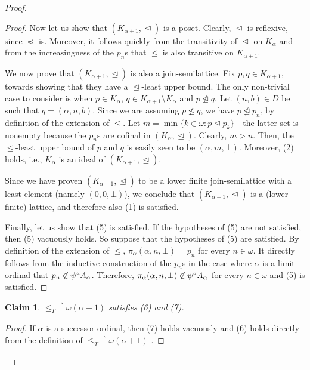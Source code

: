 \documentclass[]{amsart}
\newtheorem{claim}{Claim}[theorem]
\theoremstyle{definition}
\theoremstyle{remark}
\begin{document}
\begin{proof}
\begin{proof}
Now let us show that $(K_{\alpha+1}, \trianglelefteq)$ is a poset. Clearly, $\trianglelefteq$ is reflexive, since $\preceq$ is. Moreover, it follows quickly from the transitivity of $\trianglelefteq$ on $K_\alpha$ and from the increasingness of the $p_n$s that $\trianglelefteq$ is also transitive on $K_{\alpha+1}$. 

We now prove that $(K_{\alpha+1}, \trianglelefteq)$ is also a join-semilattice. Fix $p,q \in K_{\alpha+1}$, towards showing that they have a $\trianglelefteq$-least upper bound. The only non-trivial case to consider is when $p \in K_\alpha$, $q \in K_{\alpha+1} \setminus K_\alpha$ and $p \ntrianglelefteq q$. Let $(n, b) \in D$ be such that $q = (\alpha, n, b)$. Since we are assuming $p \ntrianglelefteq q$, we have $p \ntrianglelefteq p_n$, by definition of the extension of $\trianglelefteq$. Let $m = \min\{k \in \omega : p \trianglelefteq p_k\}$---the latter set is nonempty because the $p_n$s are cofinal in $(K_\alpha, \trianglelefteq)$. Clearly, $m > n$. Then, the $\trianglelefteq$-least upper bound of $p$ and $q$ is easily seen to be $(\alpha, m, \bot)$. Moreover, (2) holds, i.e., $K_\alpha$ is an ideal of $(K_{\alpha+1}, \trianglelefteq)$.

Since we have proven $(K_{\alpha+1}, \trianglelefteq)$ to be a lower finite join-semilattice with a least element (namely $(0, 0, \bot)$), we conclude that $(K_{\alpha+1}, \trianglelefteq)$ is a (lower finite) lattice, and therefore also (1) is satisfied. 

Finally, let us show that (5) is satisfied. If the hypotheses of (5) are not satisfied, then (5) vacuously holds. So suppose that the hypotheses of (5) are satisfied. By definition of the extension of $\trianglelefteq$, $\pi_\alpha (\alpha, n, \bot) = p_n$ for every $n\in\omega$. It directly follows from the inductive construction of the $p_n$s in the case where $\alpha$ is a limit ordinal that $p_n \not\in \psi`` A_\alpha$. Therefore, $\pi_\alpha(\alpha, n, \bot) \not\in \psi`` A_\alpha$ for every $n\in\omega$ and (5) is satisfied.
\end{proof}

\begin{claim}
${\le_T} \upharpoonright \omega(\alpha+1)$ satisfies {\upshape (6)} and {\upshape (7)}.
\end{claim}
\begin{proof}
If $\alpha$ is a successor ordinal, then (7) holds vacuously and (6) holds directly from the definition of ${\le_T} \upharpoonright \omega(\alpha+1)$ . 


\end{proof}
\end{proof}
\end{document}
